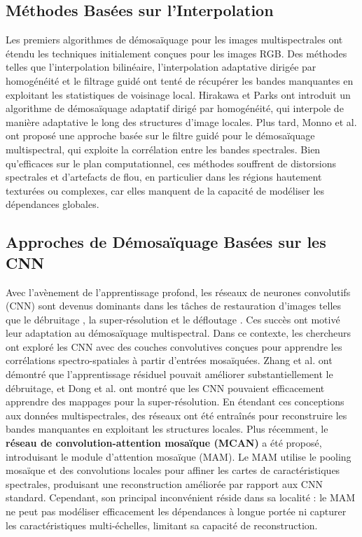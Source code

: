 \documentclass[conference]{IEEEtran}
\begin{document}
\subsection{Méthodes Basées sur l'Interpolation}
Les premiers algorithmes de démosaïquage pour les images multispectrales ont étendu les techniques initialement conçues pour les images RGB. Des méthodes telles que l'interpolation bilinéaire, l'interpolation adaptative dirigée par homogénéité et le filtrage guidé ont tenté de récupérer les bandes manquantes en exploitant les statistiques de voisinage local.
Hirakawa et Parks \cite{Hirakawa2005} ont introduit un algorithme de démosaïquage adaptatif dirigé par homogénéité, qui interpole de manière adaptative le long des structures d'image locales. Plus tard, Monno et al. \cite{Zhang2024} ont proposé une approche basée sur le filtre guidé pour le démosaïquage multispectral, qui exploite la corrélation entre les bandes spectrales. Bien qu'efficaces sur le plan computationnel, ces méthodes souffrent de distorsions spectrales et d'artefacts de flou, en particulier dans les régions hautement texturées ou complexes, car elles manquent de la capacité de modéliser les dépendances globales.


\subsection{Approches de Démosaïquage Basées sur les CNN}
Avec l'avènement de l'apprentissage profond, les réseaux de neurones convolutifs (CNN) sont devenus dominants dans les tâches de restauration d'images telles que le débruitage \cite{Zhang2017}, la super-résolution \cite{Dong2016} et le défloutage \cite{Tao2018ScaleRecurrent}. Ces succès ont motivé leur adaptation au démosaïquage multispectral.
Dans ce contexte, les chercheurs ont exploré les CNN avec des couches convolutives conçues pour apprendre les corrélations spectro-spatiales à partir d'entrées mosaïquées. Zhang et al. \cite{Zhang2017} ont démontré que l'apprentissage résiduel pouvait améliorer substantiellement le débruitage, et Dong et al. \cite{Dong2016} ont montré que les CNN pouvaient efficacement apprendre des mappages pour la super-résolution. En étendant ces conceptions aux données multispectrales, des réseaux ont été entraînés pour reconstruire les bandes manquantes en exploitant les structures locales.
Plus récemment, le \textbf{réseau de convolution-attention mosaïque (MCAN)} \cite{Feng2021} a été proposé, introduisant le module d'attention mosaïque (MAM). Le MAM utilise le pooling mosaïque et des convolutions locales pour affiner les cartes de caractéristiques spectrales, produisant une reconstruction améliorée par rapport aux CNN standard. Cependant, son principal inconvénient réside dans sa localité : le MAM ne peut pas modéliser efficacement les dépendances à longue portée ni capturer les caractéristiques multi-échelles, limitant sa capacité de reconstruction.
\end{document}
